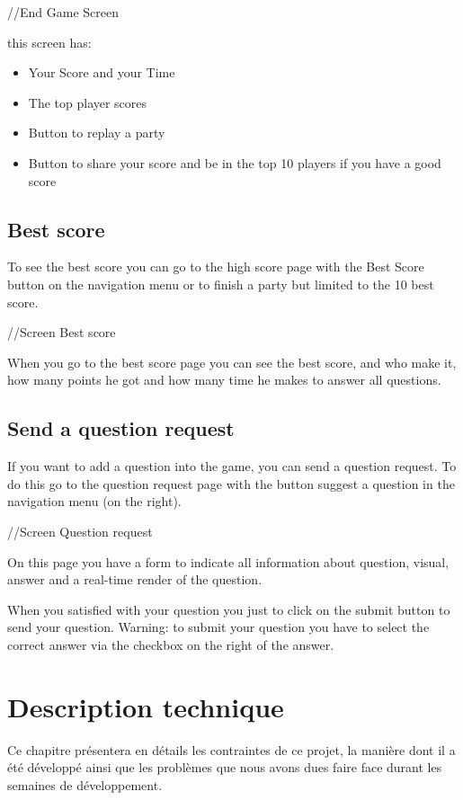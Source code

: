 \documentclass[a4paper,11pt, oneside]{book}
\begin{document}
//End Game Screen

this screen has:
\begin{itemize}
\item Your Score and your Time
\item The top player scores
\item Button to replay a party
\item Button to share your score and be in the top 10 players if you have a good score
\end{itemize}
		
\section{Best score}
To see the best score you can go to the high score page with the Best Score button on the navigation menu or to finish a party but limited to the 10 best score.

//Screen Best score

When you go to the best score page you can see the best score, and who make it, how many points he got and how many time he makes to answer all questions.

\section{Send a question request}
If you want to add a question into the game, you can send a question request.
To do this go to the question request page with the button suggest a question in the navigation menu (on the right).

//Screen Question request

On this page you have a form to indicate all information about question, visual, answer and a real-time render of the question.

When you satisfied with your question you just to click on the submit button to send your question.
Warning: to submit your question you have to select the correct answer via the checkbox on the right of the answer.

\newpage	
	\chapter{Description technique}

	Ce chapitre présentera en détails les contraintes de ce projet, la manière dont il a été développé ainsi que les problèmes que nous avons dues faire face
	durant les semaines de développement.
\end{document}
